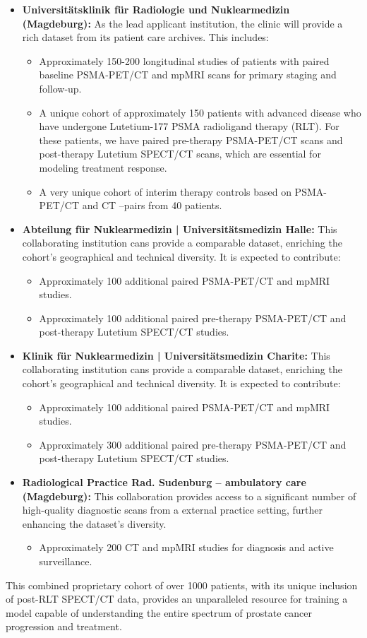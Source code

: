 \documentclass[11pt, a4paper]{article}
\begin{document}
\begin{itemize}
    \item \textbf{Universitätsklinik für Radiologie und Nuklearmedizin (Magdeburg):} As the lead applicant institution, the clinic will provide a rich dataset from its patient care archives. This includes:
    \begin{itemize}
        \item Approximately 150-200 longitudinal studies of patients with paired baseline PSMA-PET/CT and mpMRI scans for primary staging and follow-up.
        \item A unique cohort of approximately 150 patients with advanced disease who have undergone Lutetium-177 PSMA radioligand therapy (RLT). For these patients, we have paired pre-therapy PSMA-PET/CT scans and post-therapy Lutetium SPECT/CT scans, which are essential for modeling treatment response.
        \item A very unique cohort of interim therapy controls based on PSMA-PET/CT and CT –pairs from 40 patients.
    \end{itemize}
    \item \textbf{Abteilung für Nuklearmedizin | Universitätsmedizin Halle:} This collaborating institution cans provide a comparable dataset, enriching the cohort’s geographical and technical diversity. It is expected to contribute:
    \begin{itemize}
        \item Approximately 100 additional paired PSMA-PET/CT and mpMRI studies.
        \item Approximately 100 additional paired pre-therapy PSMA-PET/CT and post-therapy Lutetium SPECT/CT studies.
    \end{itemize}
    \item \textbf{Klinik für Nuklearmedizin | Universitätsmedizin Charite:} This collaborating institution cans provide a comparable dataset, enriching the cohort’s geographical and technical diversity. It is expected to contribute:
    \begin{itemize}
        \item Approximately 100 additional paired PSMA-PET/CT and mpMRI studies.
        \item Approximately 300 additional paired pre-therapy PSMA-PET/CT and post-therapy Lutetium SPECT/CT studies.
    \end{itemize}
    \item \textbf{Radiological Practice Rad. Sudenburg – ambulatory care (Magdeburg):} This collaboration provides access to a significant number of high-quality diagnostic scans from a external practice setting, further enhancing the dataset’s diversity.
    \begin{itemize}
        \item Approximately 200 CT and mpMRI studies for diagnosis and active surveillance.
    \end{itemize}
\end{itemize}
This combined proprietary cohort of over 1000 patients, with its unique inclusion of post-RLT SPECT/CT data, provides an unparalleled resource for training a model capable of understanding the entire spectrum of prostate cancer progression and treatment.
\end{document}
